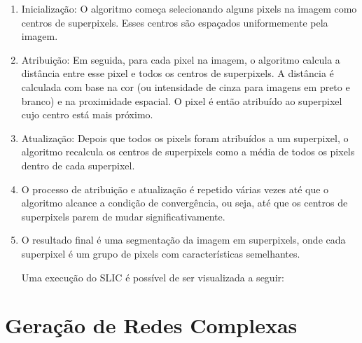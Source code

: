\begin{enumerate}

\item Inicialização: O algoritmo começa selecionando alguns pixels na
imagem como centros de superpixels. Esses centros são espaçados
uniformemente pela imagem.

\item Atribuição: Em seguida, para cada pixel na imagem, o algoritmo
calcula a distância entre esse pixel e todos os centros de
superpixels. A distância é calculada com base na cor (ou intensidade
de cinza para imagens em preto e branco) e na proximidade espacial. O
pixel é então atribuído ao superpixel cujo centro está mais próximo.

\item Atualização: Depois que todos os pixels foram atribuídos a um
superpixel, o algoritmo recalcula os centros de superpixels como a
média de todos os pixels dentro de cada superpixel.

\item O processo de atribuição e atualização é repetido várias vezes
até que o algoritmo alcance a condição de convergência, ou seja, até
que os centros de superpixels parem de mudar significativamente.

\item O resultado final é uma segmentação da imagem em superpixels, onde
cada superpixel é um grupo de pixels com características semelhantes.

Uma execução do SLIC é possível de ser visualizada a seguir:

\begin{figure}[h!]
        \captionsetup{width=12cm}
		\centering
\end{figure}


\end{enumerate}

\section{Geração de Redes Complexas}\label{sec:teorica-redes-complexas}

